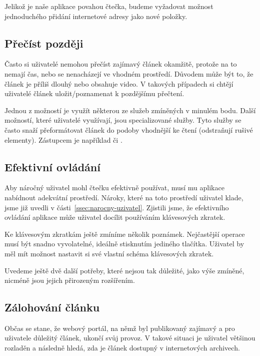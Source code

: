 Jelikož je naše aplikace povahou čtečka, budeme vyžadovat možnost jednoduchého přidání internetové adresy jako nové položky.

\subsection{Přečíst později}

Často si uživatelé nemohou přečíst zajímavý článek okamžitě, protože na to nemají čas, nebo se nenacházejí ve vhodném prostředí.
Důvodem může být to, že článek je příliš dlouhý nebo obsahuje video.
V takových případech si chtějí uživatelé článek uložit/poznamenat k pozdějšímu přečtení.

Jednou z možností je využít některou ze služeb zmíněných v minulém bodu.
Další možností, které uživatelé využívají, jsou specializované služby.
Tyto služby se často snaží přeformátovat článek do podoby vhodnější ke čtení (odstraňují rušivé elementy).
Zástupcem je například  či .

\subsection{Efektivní ovládání}

Aby náročný uživatel mohl čtečku efektivně používat, musí mu aplikace nabídnout adekvátní prostředí.
Nároky, které na toto prostředí uživatel klade, jsme již uvedli v části~\ref{ssec:narocny-uzivatel}.
Zjistili jsme, že efektivního ovládání aplikace může uživatel docílit používáním klávesových zkratek.

Ke klávesovým zkratkám ještě zmíníme několik poznámek.
Nejčastější operace musí být snadno vyvolatelné, ideálně stisknutím jediného tlačítka.
Uživatel by měl mít možnost nastavit si své vlastní schéma klávesových zkratek.

\bigskip

Uvedeme ještě dvě další potřeby, které nejsou tak důležité, jako výše zmíněné, nicméně jsou jejich přirozeným rozšířením.

\subsection{Zálohování článku}

Občas se stane, že webový portál, na němž byl publikovaný zajímavý a pro uživatele důležitý článek, ukončí svůj provoz.
V takové situaci je uživatel většinou rozladěn a následně hledá, zda je článek dostupný v internetových archivech.

